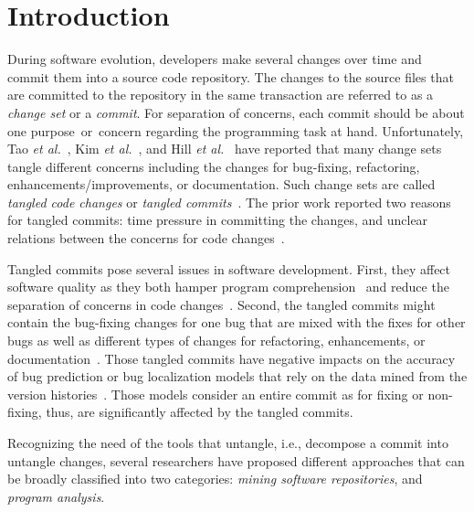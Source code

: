 \section{Introduction}
\label{intro:sec}

During software evolution, developers make several changes over time
and commit them into a source code repository. The changes to the
source files that are committed to the repository in the same
transaction are referred to as a {\em change set} or a {\em
  commit}. For separation of concerns, each commit should be about one
purpose~or~concern regarding the programming task at hand.
Unfortunately, Tao {\em et al.}~\cite{tao-fse12}, Kim {\em et
  al.}~\cite{kim-emse16,kim-msr13}, and Hill {\em et
  al.}~\cite{hill-tse12} have reported that many change sets tangle
different concerns including the changes for bug-fixing, refactoring,
enhancements/improvements, or documentation. Such change sets are
called {\em tangled code changes} or {\em tangled
  commits}~\cite{kim-emse16,kim-msr13}. The prior work reported two
reasons for tangled commits: time pressure in committing the changes,
and unclear relations between the concerns for code
changes~\cite{flexeme-fse20}.

Tangled commits pose several issues in software development. First,
they affect software quality as they both hamper program
comprehension~\cite{tao-fse12} and reduce the separation of concerns
in code changes~\cite{flexeme-fse20}. Second, the tangled commits
might contain the bug-fixing changes for one bug that are mixed with
the fixes for other bugs as well as different types of changes for
refactoring, enhancements, or
documentation~\cite{kim-emse16,kim-msr13,nguyen-issre13}. Those
tangled commits have negative impacts on the accuracy of bug
prediction or bug localization models that rely on the data mined from
the version histories~\cite{kim-emse16,kim-msr13}. Those models
consider an entire commit as for fixing or non-fixing, thus, are
significantly affected by the tangled commits.

Recognizing the need of the tools that untangle, i.e., decompose a
commit into untangle changes, several researchers have proposed
different approaches that can be broadly classified into two
categories: {\em mining software repositories}, and {\em program
  analysis}.

